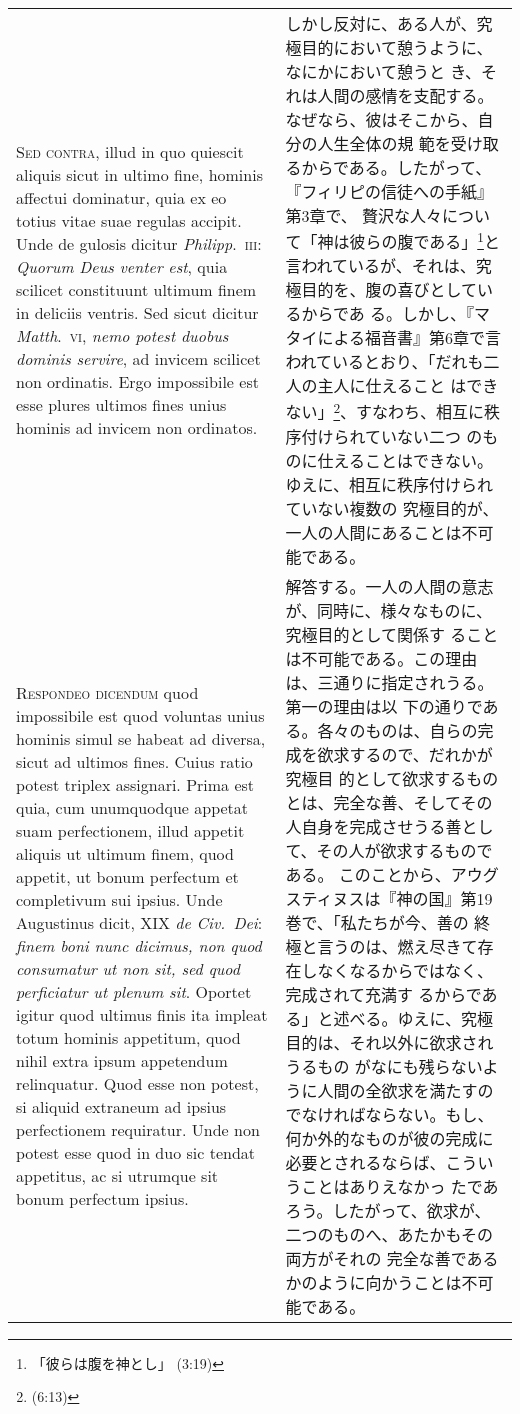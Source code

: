 \documentclass[10pt]{jsarticle} %
\begin{document}
\begin{longtable}{p{21em}p{21em}}
\\


{\scshape Sed contra}, illud in quo quiescit
aliquis sicut in ultimo fine, hominis affectui dominatur, quia ex eo
totius vitae suae regulas accipit. Unde de gulosis dicitur {\itshape Philipp}.~{\scshape iii}:
{\itshape Quorum Deus venter est}, quia scilicet constituunt ultimum finem in
deliciis ventris. Sed sicut dicitur {\itshape Matth}.~{\scshape vi}, {\itshape nemo potest duobus
dominis servire}, ad invicem scilicet non ordinatis. Ergo impossibile est
esse plures ultimos fines unius hominis ad invicem non ordinatos.


&


しかし反対に、ある人が、究極目的において憩うように、なにかにおいて憩うと
 き、それは人間の感情を支配する。なぜなら、彼はそこから、自分の人生全体の規
 範を受け取るからである。したがって、『フィリピの信徒への手紙』第3章で、
 贅沢な人々について「神は彼らの腹である」\footnote{「彼らは腹を神とし」
 (3:19)}と言われているが、それは、究極目的を、腹の喜びとしているからであ
 る。しかし、『マタイによる福音書』第6章で言われているとおり、「だれも二人の主人に仕えること
 はできない」\footnote{(6:13)}、すなわち、相互に秩序付けられていない二つ
 のものに仕えることはできない。ゆえに、相互に秩序付けられていない複数の
 究極目的が、一人の人間にあることは不可能である。

\\


{\scshape Respondeo dicendum} quod impossibile est
quod voluntas unius hominis simul se habeat ad diversa, sicut ad ultimos
fines. Cuius ratio potest triplex assignari. Prima est quia, cum
unumquodque appetat suam perfectionem, illud appetit aliquis ut ultimum
finem, quod appetit, ut bonum perfectum et completivum sui ipsius. Unde
Augustinus dicit, XIX {\itshape de Civ.~Dei}: {\itshape finem boni nunc dicimus, non quod
consumatur ut non sit, sed quod perficiatur ut plenum sit}. Oportet
igitur quod ultimus finis ita impleat totum hominis appetitum, quod
nihil extra ipsum appetendum relinquatur. Quod esse non potest, si
aliquid extraneum ad ipsius perfectionem requiratur. Unde non potest
esse quod in duo sic tendat appetitus, ac si utrumque sit bonum
perfectum ipsius. 


&

解答する。一人の人間の意志が、同時に、様々なものに、究極目的として関係す
 ることは不可能である。この理由は、三通りに指定されうる。第一の理由は以
 下の通りである。各々のものは、自らの完成を欲求するので、だれかが究極目
 的として欲求するものとは、完全な善、そしてその人自身を完成させうる善とし
 て、その人が欲求するものである。
 このことから、アウグスティヌスは『神の国』第19巻で、「私たちが今、善の
 終極と言うのは、燃え尽きて存在しなくなるからではなく、完成されて充満す
 るからである」と述べる。ゆえに、究極目的は、それ以外に欲求されうるもの
 がなにも残らないように人間の全欲求を満たすのでなければならない。もし、
 何か外的なものが彼の完成に必要とされるならば、こういうことはありえなかっ
 たであろう。したがって、欲求が、二つのものへ、あたかもその両方がそれの
 完全な善であるかのように向かうことは不可能である。
 


\end{longtable}
\end{document}
